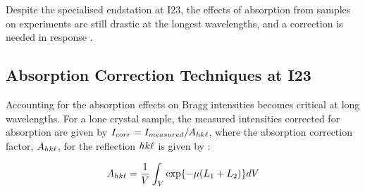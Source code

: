 
Despite the specialised endstation at I23, the effects of absorption from samples on experiments are still drastic at the longest wavelengths, and a correction is needed in response \cite{Kazantsev2021}.

\subsection{Absorption Correction Techniques at I23}





Accounting for the absorption effects on Bragg intensities becomes critical at long wavelengths. For a lone crystal sample, the measured intensities corrected for absorption are given by $I_{corr} = I_{measured}/A_{hk\ell}$, where the absorption correction factor, $A_{hk\ell}$, for the reflection $hk\ell$ is given by \cite{Albrecht1939}: %

\begin{equation}
    A_{hk\ell} = \frac{1}{V} \int_V \exp{-\mu(L_1+L_2)} dV
    \label{AbsFactor}
\end{equation}

